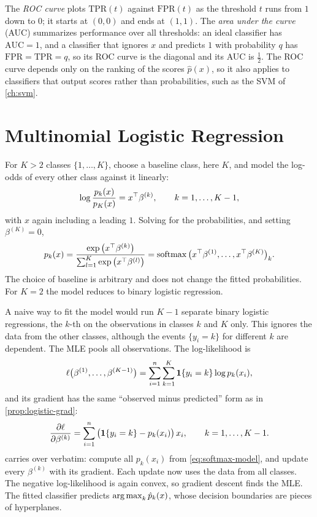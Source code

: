 The \emph{ROC curve} plots $\mathrm{TPR}(t)$ against $\mathrm{FPR}(t)$ as the threshold $t$ runs from $1$ down to $0$; it starts at $(0,0)$ and ends at $(1,1)$. The \emph{area under the curve} (AUC) summarizes performance over all thresholds: an ideal classifier has $\mathrm{AUC}=1$, and a classifier that ignores $x$ and predicts $1$ with probability $q$ has $\mathrm{FPR}=\mathrm{TPR}=q$, so its ROC curve is the diagonal and its AUC is $\frac12$. The ROC curve depends only on the ranking of the scores $\hat p(x)$, so it also applies to classifiers that output scores rather than probabilities, such as the SVM of \cref{ch:svm}.

\section{Multinomial Logistic Regression}\label{sec:softmax-regression}

For $K>2$ classes $\{1,\dots,K\}$, choose a baseline class, here $K$, and model the log-odds of every other class against it linearly:
\[
\log\frac{p_k(x)}{p_K(x)}=x^{\top}\beta^{(k)},\qquad k=1,\dots,K-1,
\]
with $x$ again including a leading $1$. Solving for the probabilities, and setting $\beta^{(K)}=0$,
\begin{equation}\label{eq:softmax-model}
p_k(x)=\frac{\exp\big(x^{\top}\beta^{(k)}\big)}{\sum_{l=1}^K\exp\big(x^{\top}\beta^{(l)}\big)}=\operatorname{softmax}\big(x^{\top}\beta^{(1)},\dots,x^{\top}\beta^{(K)}\big)_k.
\end{equation}
The choice of baseline is arbitrary and does not change the fitted probabilities. For $K=2$ the model reduces to binary logistic regression.

A naive way to fit the model would run $K-1$ separate binary logistic regressions, the $k$-th on the observations in classes $k$ and $K$ only. This ignores the data from the other classes, although the events $\{y_i=k\}$ for different $k$ are dependent. The MLE pools all observations. The log-likelihood is
\[
\ell\big(\beta^{(1)},\dots,\beta^{(K-1)}\big)=\sum_{i=1}^n\sum_{k=1}^K\mathbf{1}\{y_i=k\}\log p_k(x_i),
\]
and its gradient has the same ``observed minus predicted'' form as in \cref{prop:logistic-grad}:
\[
\frac{\partial\ell}{\partial\beta^{(k)}}=\sum_{i=1}^n\big(\mathbf{1}\{y_i=k\}-p_k(x_i)\big)\,x_i,\qquad k=1,\dots,K-1.
\]
 carries over verbatim: compute all $p_k(x_i)$ from \eqref{eq:softmax-model}, and update every $\beta^{(k)}$ with its gradient. Each update now uses the data from all classes. The negative log-likelihood is again convex, so gradient descent finds the MLE. The fitted classifier predicts $\operatorname*{arg\,max}_k\hat p_k(x)$, whose decision boundaries are pieces of hyperplanes.

